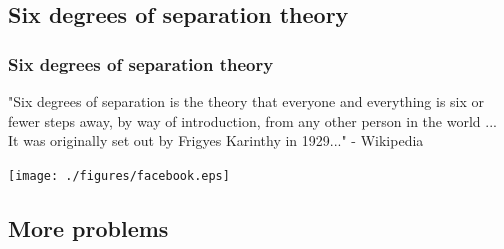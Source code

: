 \documentclass[article]{beamer}
\begin{document}
\subsection{Six degrees of separation theory}
\begin{frame}
	\frametitle{Six degrees of separation theory}
	"Six degrees of separation is the theory that everyone and everything is six or fewer steps away, by way of introduction, from any other person in the world ... It was originally set out by Frigyes Karinthy in 1929..." - Wikipedia
	
	\begin{center}
			\texttt{[image: ./figures/facebook.eps]}
	\end{center}
\end{frame}

\subsection{More problems}
\end{document}
